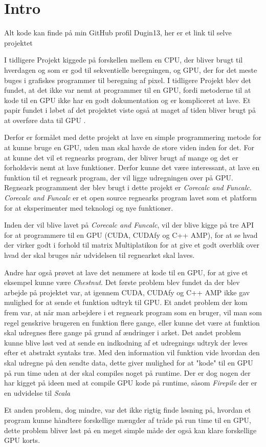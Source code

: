 \section{Intro}
Alt kode kan finde på min GitHub profil Dugin13, her er et link til selve projektet \cite{GitHubProjekt}

I tidligere Projekt \cite{P9} kiggede på forskellen mellem en CPU, der bliver brugt til hverdagen og som er god til sekventielle beregningen, og GPU, der for det meste buges i grafiskes programmer til beregning af pixel. I tidligere Projekt blev det fundet, at det ikke var nemt at programmer til en GPU, fordi metoderne til at kode til en GPU ikke har en godt dokumentation og er kompliceret at lave. Et papir fundet i løbet af det projektet viste også at maget af tiden bliver brugt på at overføre data til GPU \cite{lee2010debunking}. 

Derfor er formålet med dette projekt at lave en simple programmering metode for at kunne bruge en GPU, uden man skal havde de store viden inden for det. For at kunne det vil et regnearks program, der bliver brugt af mange og det er forholdsvis nemt at lave funktioner. Derfor kunne det være interessant, at lave en funktion til et regneark program, der vil ligge udregningen over på GPU. Regneark programment der blev brugt i dette projekt er \textit{Corecalc and Funcalc}. \textit{Corecalc and Funcalc} er et open source regnearks program lavet som et platform for at eksperimenter med teknologi og nye funktioner.

Inden der vil blive lavet på \textit{Corecalc and Funcalc}, vil der blive kigge på tre API for at programmere til en GPU (CUDA, CUDAfy og C++ AMP), for at se hvad der virker godt i forhold til matrix Multiplatikon for at give et godt overblik over hvad der skal bruges når udvidelsen til regnearket skal laves.

Andre har også prøvet at lave det nemmere at kode til en GPU, for at give et eksempel kunne være \textit{Chestnut}\cite{Chestnut2012}. Det første problem blev fundet da der blev arbejde på projektet var, at igennem CUDA, CUDAfy og C++ AMP ikke gav mulighed for at sende et funktion udtryk til GPU. Et andet problem der kom frem var, at når man arbejdere i et regneark program som en bruger, vil man som regel genskrive brugeren en funktion flere gange, eller kunne det være at funktion skal udregnes flere gange på grund af ændringer i arket. Det andet problem kunne blive løst ved at sende en indkodning af et udregnings udtryk der leves efter et abstrakt syntaks træ. Med den information vil funktion vide hvordan den skal udregne på den sendte data, dette giver mulighed for at "kode" til en GPU på run time uden at der skal compiles noget på runtime. Der er dog nogen der har kigget på ideen med at compile GPU kode på runtime, såsom \textit{Firepile} \cite{Firepile2011} der er en udvidelse til \textit{Scala}

Et anden problem, dog mindre, var det ikke rigtig finde løsning på, hvordan et program kunne håndtere forskellige mængder af tråde på run time til en GPU, dette problem bliver løst på en meget simple måde der også kan klare forskellige GPU korts.